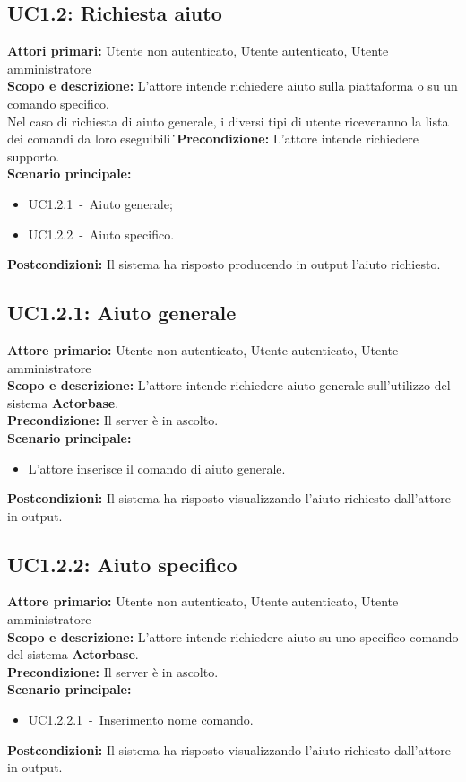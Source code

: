 \documentclass{scalatekids-article}
\begin{document}
\subsection{UC1.2: Richiesta aiuto}

\textbf{Attori primari:} Utente non autenticato, Utente autenticato, Utente amministratore\\
\textbf{Scopo e descrizione:} L'attore intende richiedere aiuto sulla piattaforma o su un comando specifico.\\Nel caso di richiesta di aiuto generale, i diversi tipi di utente riceveranno la lista dei comandi da loro eseguibili\.\
\textbf{Precondizione:} L'attore intende richiedere supporto.\\
\textbf{Scenario principale:}
\begin{itemize}
\item UC1.2.1\ -\ Aiuto generale;
\item UC1.2.2\ -\ Aiuto specifico.
\end{itemize}
\textbf{Postcondizioni:} Il sistema ha risposto producendo in output l'aiuto richiesto.

\subsection{UC1.2.1: Aiuto generale}

\textbf{Attore primario:} Utente non autenticato, Utente autenticato, Utente amministratore\\
\textbf{Scopo e descrizione:} L'attore intende richiedere aiuto generale sull'utilizzo del sistema \textbf{Actorbase}.\\
\textbf{Precondizione:} Il server è in ascolto.\\
\textbf{Scenario principale:}
\begin{itemize}
\item L'attore inserisce il comando di aiuto generale.
\end{itemize}
\textbf{Postcondizioni:} Il sistema ha risposto visualizzando l'aiuto richiesto dall'attore in output.

\subsection{UC1.2.2: Aiuto specifico}

\textbf{Attore primario:} Utente non autenticato, Utente autenticato, Utente amministratore\\
\textbf{Scopo e descrizione:} L'attore intende richiedere aiuto su uno specifico comando del sistema \textbf{Actorbase}.\\
\textbf{Precondizione:} Il server è in ascolto.\\
\textbf{Scenario principale:}
\begin{itemize}
\item UC1.2.2.1\ -\ Inserimento nome comando.
\end{itemize}
\textbf{Postcondizioni:} Il sistema ha risposto visualizzando l'aiuto richiesto dall'attore in output.
\end{document}
